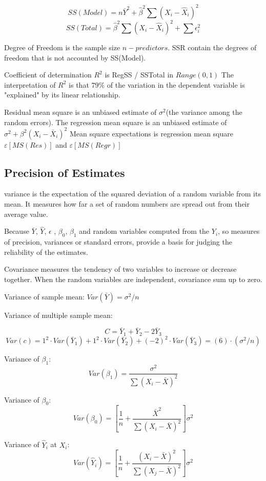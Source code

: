 \documentclass[12pt]{article}
\begin{document}
$$SS(Model) = n\bar{Y}^2 + \hat{\beta}^2\sum(X_i-\hat{X}_i)^2$$
$$SS(Total) = \hat{\beta}^2\sum(X_i-\hat{X}_i)^2 + \sum\epsilon_i^2$$

Degree of Freedom is the sample size $n - predictors$. SSR contain the degrees of freedom that is not accounted by SS(Model).

Coefficient of determination $R^2$ is RegSS / SSTotal in $Range(0,1)$
The interpretation of $R^2$ is that $79\%$ of the variation in the dependent variable is "explained" by its linear relationship.

Residual mean square is an unbiased estimate of $\sigma^2$(the variance among the random errors).
The regression mean square is an unbiased estimate of $\sigma^2 +\beta^2(X_i-\bar{X}_i)^2$
Mean square expectations is regression mean square $\varepsilon[MS(Res)]$ and $\varepsilon[MS(Regr)]$

\subsection{Precision of Estimates}

variance is the expectation of the squared deviation of a random variable from its mean.
It measures how far a set of random numbers are spread out from their average value.

Because $\bar{Y}$, $\hat{Y}$, $\epsilon$ , $\beta_0$, $\beta_1$ and random variables computed from the $Y_i$, so measures of precision, variances or standard errors, provide a basis for judging the reliability of the estimates.

Covariance measures the tendency of two variables to increase or decrease together.
When the random variables are independent, covariance sum up to zero.

Variance of sample mean:    $Var(\bar{Y}) = \sigma^2 / n$

Variance of multiple sample mean:

$$C = \bar{Y}_1 + \bar{Y}_2 - 2\bar{Y}_3$$
$$Var(c) =  1^2 \cdot Var(\bar{Y}_1) + 1^2 \cdot Var(\bar{Y}_2) + (-2)^2 \cdot Var(\bar{Y}_3)
       =  (6)\cdot (\sigma^2/n)$$

Variance of $\beta_1$:
$$Var(\beta_1) = \frac{\sigma^2}{\sum(X_i-\bar{X})^2}$$

Variance of $\beta_0$:
$$Var(\beta_0) = \left[\frac{1}{n} + \frac{\bar{X}^2}{\sum(X_i-\bar{X})^2}\right]\sigma^2$$

Variance of $\hat{Y}_i$ at $X_i$:
$$Var(\hat{Y}_i) = \left[\frac{1}{n} + \frac{(X_i - \bar{X})^2}{ \sum (X_j - \bar{X})^2}\right]\sigma^2$$
\end{document}
